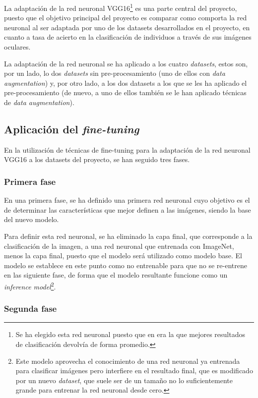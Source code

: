 La adaptación de la red neuronal VGG16\footnote{Se ha elegido esta red neuronal puesto que en \cite{tfg_iris_2020} era la que mejores resultados de clasificación devolvía de forma promedio.} es una parte central del proyecto, puesto que el objetivo principal del proyecto es comparar como comporta la red neuronal al ser adaptada por uno de los datasets desarrollados en el proyecto, en cuanto a tasa de acierto en la clasificación de individuos a través de sus imágenes oculares. 

La adaptación de la red neuronal se ha aplicado a los cuatro \textit{datasets}, estos son, por un lado, lo dos \textit{datasets} sin pre-procesamiento (uno de ellos con \textit{data augmentation}) y, por otro lado, a los dos datasets a los que se les ha aplicado el pre-procesamiento (de nuevo, a uno de ellos también se le han aplicado técnicas de \textit{data augmentation}). 
\subsection{Aplicación del \textit{fine-tuning}}

En la  utilización de técnicas de fine-tuning para la adaptación de la red neuronal VGG16 a los datasets del proyecto, se han seguido tres fases. 

\subsubsection{Primera fase}
En una primera fase, se ha definido una primera red neuronal cuyo objetivo es el de determinar las características que mejor definen a las imágenes, siendo la base del nuevo modelo. 

Para definir esta red neuronal, se ha eliminado la capa final, que corresponde a la clasificación de la imagen, a una red neuronal que entrenada con ImageNet, menos la capa final, puesto que el modelo será utilizado como modelo base. El modelo se establece en este punto como no entrenable para que no se re-entrene en las siguiente fase, de forma que el modelo resultante funcione como un \textit{inference model}\footnote{Este modelo aprovecha el conocimiento de una red neuronal ya entrenada para clasificar imágenes pero interfiere en el resultado final, que es modificado por un nuevo \textit{dataset}, que suele ser de un tamaño no lo suficientemente grande para entrenar la red neuronal desde cero.}. 

\subsubsection{Segunda fase}

